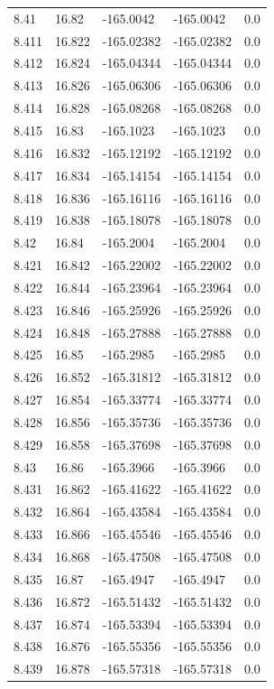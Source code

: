 \begin{tabular}{lllll}
8.41 & 16.82 & -165.0042 & -165.0042 & 0.0 \\
8.411 & 16.822 & -165.02382 & -165.02382 & 0.0 \\
8.412 & 16.824 & -165.04344 & -165.04344 & 0.0 \\
8.413 & 16.826 & -165.06306 & -165.06306 & 0.0 \\
8.414 & 16.828 & -165.08268 & -165.08268 & 0.0 \\
8.415 & 16.83 & -165.1023 & -165.1023 & 0.0 \\
8.416 & 16.832 & -165.12192 & -165.12192 & 0.0 \\
8.417 & 16.834 & -165.14154 & -165.14154 & 0.0 \\
8.418 & 16.836 & -165.16116 & -165.16116 & 0.0 \\
8.419 & 16.838 & -165.18078 & -165.18078 & 0.0 \\
8.42 & 16.84 & -165.2004 & -165.2004 & 0.0 \\
8.421 & 16.842 & -165.22002 & -165.22002 & 0.0 \\
8.422 & 16.844 & -165.23964 & -165.23964 & 0.0 \\
8.423 & 16.846 & -165.25926 & -165.25926 & 0.0 \\
8.424 & 16.848 & -165.27888 & -165.27888 & 0.0 \\
8.425 & 16.85 & -165.2985 & -165.2985 & 0.0 \\
8.426 & 16.852 & -165.31812 & -165.31812 & 0.0 \\
8.427 & 16.854 & -165.33774 & -165.33774 & 0.0 \\
8.428 & 16.856 & -165.35736 & -165.35736 & 0.0 \\
8.429 & 16.858 & -165.37698 & -165.37698 & 0.0 \\
8.43 & 16.86 & -165.3966 & -165.3966 & 0.0 \\
8.431 & 16.862 & -165.41622 & -165.41622 & 0.0 \\
8.432 & 16.864 & -165.43584 & -165.43584 & 0.0 \\
8.433 & 16.866 & -165.45546 & -165.45546 & 0.0 \\
8.434 & 16.868 & -165.47508 & -165.47508 & 0.0 \\
8.435 & 16.87 & -165.4947 & -165.4947 & 0.0 \\
8.436 & 16.872 & -165.51432 & -165.51432 & 0.0 \\
8.437 & 16.874 & -165.53394 & -165.53394 & 0.0 \\
8.438 & 16.876 & -165.55356 & -165.55356 & 0.0 \\
8.439 & 16.878 & -165.57318 & -165.57318 & 0.0 \\

\end{tabular}
